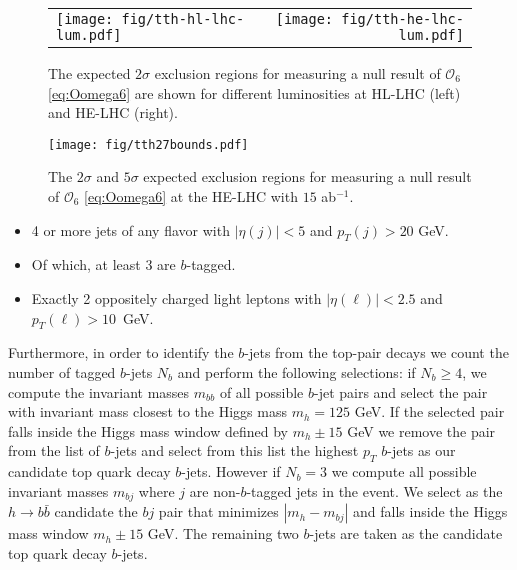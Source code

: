 \documentclass[11pt,a4paper]{article}
\newcommand{\mc}[1]{\mathcal{#1}}
\begin{document}
\begin{figure}[t!]
	\centering 	
	\begin{tabular}{lr}
		\texttt{[image: fig/tth-hl-lhc-lum.pdf]} &
		\texttt{[image: fig/tth-he-lhc-lum.pdf]}
	\end{tabular}
	\caption{The expected $2\sigma$ exclusion regions for measuring a null result of $\mc{O}_6$ \eqref{eq:Oomega6} are shown for different luminosities at HL-LHC (left) and HE-LHC (right).  }
	
	\label{fig:tthlumbounds}
\end{figure}

\begin{figure}[!t]
	\centering 	
	\texttt{[image: fig/tth27bounds.pdf]}
	\caption{The $2\sigma$ and $5\sigma$ expected exclusion regions for measuring a null result of $\mc{O}_6$ \eqref{eq:Oomega6} at the HE-LHC with $15$ ab$^{-1}$.}	
	\label{fig:tth27bounds}
\end{figure}

\begin{itemize}
	\item 4 or more jets of any flavor with $|\eta(j)|<5$ and $p_T (j) > 20$ GeV.
	\item Of which, at least 3 are $b$-tagged.
	\item Exactly 2 oppositely charged light leptons with $|\eta(\ell)|<2.5$ and $p_T(\ell)>10$~GeV.
\end{itemize}

\noindent Furthermore, in order to identify the $b$-jets from the top-pair decays we count the number of tagged $b$-jets $N_b$ and perform the following selections: if $N_b\ge 4$, we compute the invariant masses $m_{bb}$ of all possible $b$-jet pairs and select the pair with invariant mass closest to the Higgs mass $m_h=125$ GeV. If the selected pair falls inside the Higgs mass window defined by $m_h\pm 15$ GeV we remove the pair from the list of $b$-jets and select from this list the highest $p_T$ $b$-jets as our candidate top quark decay $b$-jets. However if $N_b=3$ we compute all possible invariant masses $m_{bj}$ where $j$ are non-$b$-tagged jets in the event. We select as the $h\to b\bar b$ candidate the $bj$ pair that minimizes $|m_h-m_{bj}|$ and falls inside the Higgs mass window $m_h\pm 15$ GeV. The remaining two $b$-jets are taken as the candidate top quark decay $b$-jets.\\
\end{document}
